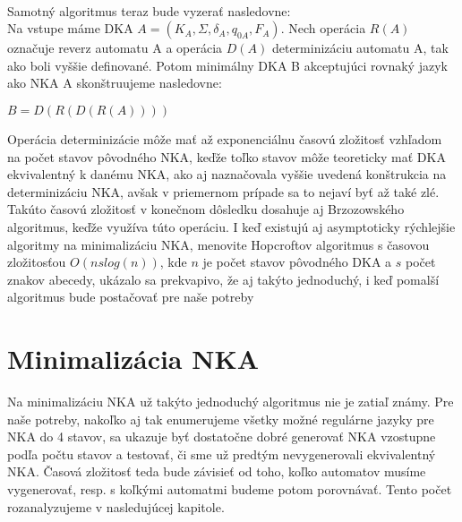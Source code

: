 \paragraph{}
Samotný algoritmus teraz bude vyzerať nasledovne:\\
Na vstupe máme DKA $A=(K_A,\Sigma,\delta_A,q_{0A},F_A)$. Nech operácia $R(A)$ označuje reverz automatu A a operácia $D(A)$ determinizáciu automatu A, tak ako boli vyššie definované. Potom minimálny DKA B akceptujúci rovnaký jazyk ako NKA A skonštruujeme nasledovne:
\\
\centerline{$B=D(R(D(R(A))))$}
Operácia determinizácie môže mať až exponenciálnu časovú zložitosť vzhľadom na počet stavov pôvodného NKA, keďže toľko stavov môže teoreticky mať DKA ekvivalentný k danému NKA, ako aj naznačovala vyššie uvedená konštrukcia na determinizáciu NKA, avšak v priemernom prípade sa to nejaví byť až také zlé. Takúto časovú zložitosť v konečnom dôsledku dosahuje aj Brzozowského algoritmus, keďže využíva túto operáciu. I keď existujú aj asymptoticky rýchlejšie algoritmy na minimalizáciu NKA, menovite Hopcroftov algoritmus s časovou zložitosťou $O(nslog(n))$, kde $n$ je počet stavov pôvodného DKA a $s$ počet znakov abecedy, ukázalo sa prekvapivo, že aj takýto jednoduchý, i keď pomalší algoritmus bude postačovať pre naše potreby

\section{Minimalizácia NKA}

Na minimalizáciu NKA už takýto jednoduchý algoritmus nie je zatiaľ známy. Pre naše potreby, nakoľko aj tak enumerujeme všetky možné regulárne jazyky pre NKA do 4 stavov, sa ukazuje byť dostatočne dobré generovať NKA vzostupne podľa počtu stavov a testovať, či sme už predtým nevygenerovali ekvivalentný NKA. Časová zložitosť teda bude závisieť od toho, koľko automatov musíme vygenerovať, resp. s koľkými automatmi budeme potom porovnávať. Tento počet rozanalyzujeme v nasledujúcej kapitole.

